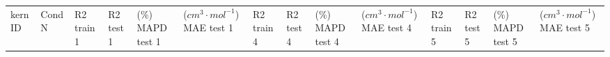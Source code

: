 \documentclass[journal=jacsat,manuscript=article]{achemso}
\begin{document}
\begin{table}[H]
    \centering
    \begin{tabular}{>{\centering\arraybackslash}p{1.0cm}>{\centering\arraybackslash}p{1.0cm}>{\centering\arraybackslash}p{0.75cm}>{\centering\arraybackslash}p{0.75cm}>{\centering\arraybackslash}p{1.0cm}>{\centering\arraybackslash}p{1.0cm}>{\centering\arraybackslash}p{0.75cm}>{\centering\arraybackslash}p{0.75cm}>{\centering\arraybackslash}p{1cm}>{\centering\arraybackslash}p{0.75cm}>{\centering\arraybackslash}p{0.75cm}>{\centering\arraybackslash}p{0.75cm}>{\centering\arraybackslash}p{1cm}>{\centering\arraybackslash}p{0.75cm}}
       \vspace{1.15cm}  kern ID& 
       \vspace{1.15cm} Cond   N& 
       \vspace{0.66cm} R2  train     1&  
 \vspace{0.66cm} R2  test   1& 
 \vspace{0.146cm} (\%) MAPD test \hspace{0.5cm}  1&  
 ($cm^{3} \cdot mol^{-1}$) MAE test  \hspace{0.5cm}   1&  \vspace{0.66cm} R2 train   4& \vspace{0.66cm} R2 test   4& \vspace{0.146cm} (\%) MAPD test  \hspace{0.5cm}  4&  
 ($cm^{3} \cdot mol^{-1}$) MAE test  \hspace{0.5cm}   4& \vspace{0.66cm} R2   train      5& 
 \vspace{0.66cm} R2   test     5& 
 \vspace{0.146cm} (\%) MAPD test  \hspace{0.5cm}   5&
 ($cm^{3} \cdot mol^{-1}$) MAE test  \hspace{0.5cm}   5
 


\end{tabular}
\end{table}
\end{document}
